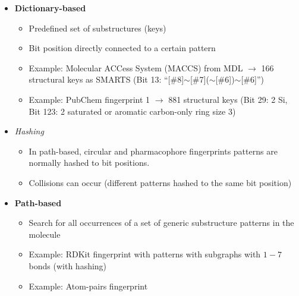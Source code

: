 \begin{itemize}
    \item \textbf{Dictionary-based}
    \begin{itemize}
        \item Predefined set of substructures (keys)
        \item Bit position directly connected to a certain pattern
        \item Example: Molecular ACCess System (MACCS) from MDL $\rightarrow$ 166 structural keys as SMARTS (Bit 13: “[$\#$8]$\sim$[$\#$7]($\sim$[$\#$6])$\sim$[$\#$6]”)
        \item Example: PubChem fingerprint 1 $\rightarrow$ 881 structural keys (Bit 29: 2 Si, Bit 123: 2 saturated or aromatic carbon-only ring size 3)
    \end{itemize}
    \item \emph{Hashing}
    \begin{itemize}
        \item In path-based, circular and pharmacophore fingerprints patterns are normally hashed to bit positions.
        \item Collisions can occur (different patterns hashed to the same bit position)
    \end{itemize}
    \item \textbf{Path-based}
    \begin{itemize}
        \item Search for all occurrences of a set of generic substructure patterns in the molecule
        \item Example: RDKit fingerprint with patterns with subgraphs with $1-7$ bonds (with hashing)
        \item Example: Atom-pairs fingerprint
    \end{itemize}
    \begin{center}\includegraphics[width=0.85\textwidth{img/cheminformatics/FingerprintsPathBased.png}\end{center}

\end{itemize}

